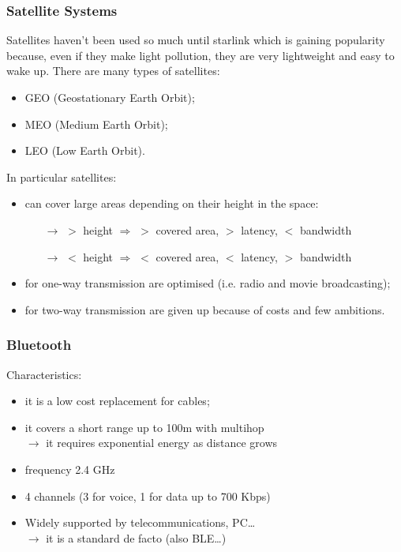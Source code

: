 \subsubsection{Satellite Systems}
Satellites haven't been used so much until starlink which is gaining popularity because,
even if they make light pollution, they are very lightweight and easy to wake up.
There are many types of satellites:
\begin{itemize}
    \item GEO (Geostationary Earth Orbit);
    \item MEO (Medium Earth Orbit);
    \item LEO (Low Earth Orbit).
\end{itemize}
In particular satellites:
\begin{itemize}
    \item can cover large areas depending on their height in the space:
    \begin{itemize}
        \item[$\rightarrow$] $>$ height $\Rightarrow$ $>$ covered area, $>$ latency, $<$ bandwidth
        \item[$\rightarrow$] $<$ height $\Rightarrow$ $<$ covered area, $<$ latency, $>$ bandwidth
    \end{itemize}
    \item for one-way transmission are optimised (i.e. radio and movie broadcasting);
    \item for two-way transmission are given up because of costs and few ambitions.
\end{itemize}

\subsubsection{Bluetooth}

Characteristics:
\begin{itemize}
    \item it is a low cost replacement for cables;
    \item it covers a short range up to 100m with multihop\\
    $\rightarrow$ it requires exponential energy as distance
    grows
    \item frequency 2.4 GHz
    \item 4 channels (3 for voice, 1 for data up to 700 Kbps)
    \item Widely supported by telecommunications, PC\dots\\
    $\rightarrow$ it is a standard de facto (also BLE\dots)
\end{itemize}

